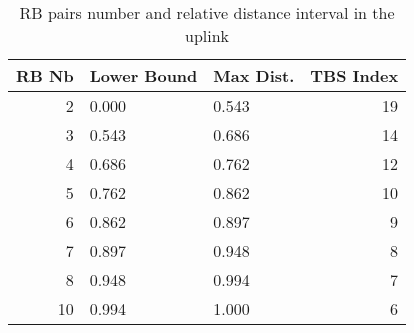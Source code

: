 \begin{table}
	\centering
	\caption{RB pairs number and relative distance interval in the uplink}
	\label{tab:uplink_RB_Distance_Interval}
	\begin{tabular}{rllr}
		\toprule
		RB Nb & Lower Bound & Max Dist. &  TBS Index \\
		\midrule
		2 &       0.000 &     0.543 &         19 \\
		3 &       0.543 &     0.686 &         14 \\
		4 &       0.686 &     0.762 &         12 \\
		5 &       0.762 &     0.862 &         10 \\
		6 &       0.862 &     0.897 &          9 \\
		7 &       0.897 &     0.948 &          8 \\
		8 &       0.948 &     0.994 &          7 \\
		10 &       0.994 &     1.000 &          6 \\
		\bottomrule
	\end{tabular}
\end{table}
